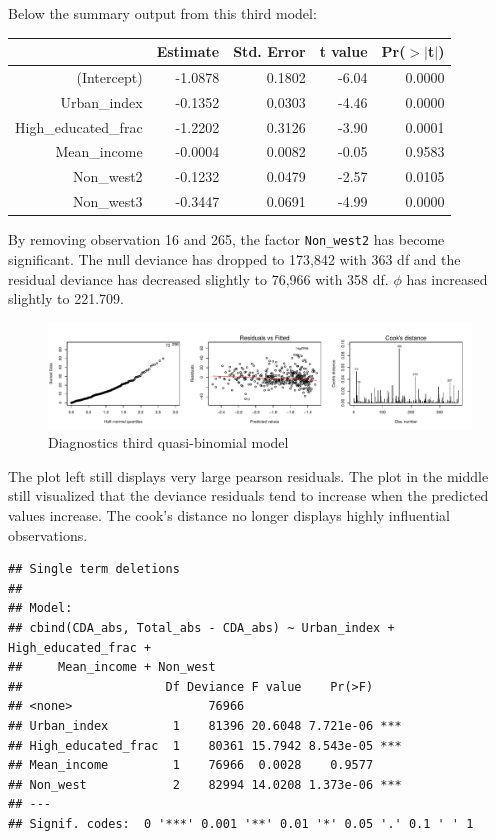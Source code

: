 \documentclass[11pt,]{article}
\begin{document}
Below the summary output from this third model:

\begin{table}[ht]
\centering
\begin{tabular}{rrrrr}
  \hline
 & Estimate & Std. Error & t value & Pr($>$$|$t$|$) \\ 
  \hline
(Intercept) & -1.0878 & 0.1802 & -6.04 & 0.0000 \\ 
  Urban\_index & -0.1352 & 0.0303 & -4.46 & 0.0000 \\ 
  High\_educated\_frac & -1.2202 & 0.3126 & -3.90 & 0.0001 \\ 
  Mean\_income & -0.0004 & 0.0082 & -0.05 & 0.9583 \\ 
  Non\_west2 & -0.1232 & 0.0479 & -2.57 & 0.0105 \\ 
  Non\_west3 & -0.3447 & 0.0691 & -4.99 & 0.0000 \\ 
   \hline
\end{tabular}
\end{table}

By removing observation 16 and 265, the factor \texttt{Non\_west2} has
become significant. The null deviance has dropped to 173,842 with 363 df
and the residual deviance has decreased slightly to 76,966 with 358 df.
\(\phi\) has increased slightly to 221.709.

\begin{figure}[H]

{\centering \includegraphics{Report_files/figure-latex/unnamed-chunk-18-1} 

}

\caption{\label{ass_mdl3}Diagnostics third quasi-binomial model}\label{fig:unnamed-chunk-18}
\end{figure}

The plot left still displays very large pearson residuals. The plot in
the middle still visualized that the deviance residuals tend to increase
when the predicted values increase. The cook's distance no longer
displays highly influential observations.

\begin{verbatim}
## Single term deletions
## 
## Model:
## cbind(CDA_abs, Total_abs - CDA_abs) ~ Urban_index + High_educated_frac + 
##     Mean_income + Non_west
##                    Df Deviance F value    Pr(>F)    
## <none>                   76966                      
## Urban_index         1    81396 20.6048 7.721e-06 ***
## High_educated_frac  1    80361 15.7942 8.543e-05 ***
## Mean_income         1    76966  0.0028    0.9577    
## Non_west            2    82994 14.0208 1.373e-06 ***
## ---
## Signif. codes:  0 '***' 0.001 '**' 0.01 '*' 0.05 '.' 0.1 ' ' 1
\end{verbatim}
\end{document}
